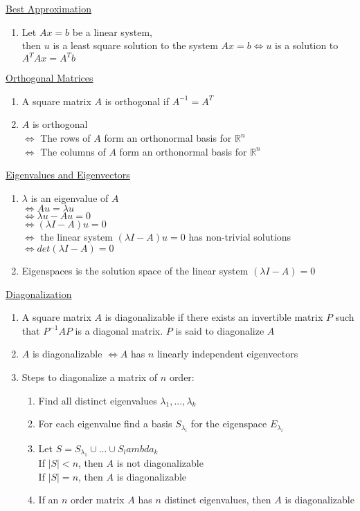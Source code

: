 \documentclass[a4paper,1pt,landscape]{article}
\begin{document}
\begin{multicols}{3}
\underline{Best Approximation}
\begin{enumerate}
    \item Let $Ax = b$ be a linear system, \\
    then $u$ is a least square solution to the system $Ax = b \Leftrightarrow u$ is a solution to $A^TAx = A^Tb$
\end{enumerate}

\underline{Orthogonal Matrices}
\begin{enumerate}
    \item A square matrix $A$ is orthogonal if $A^{-1} = A^T$
    \item $A$ is orthogonal \\
    $\Leftrightarrow$ The rows of $A$ form an orthonormal basis for $\mathbb{R}^n$ \\
    $\Leftrightarrow$ The columns of $A$ form an orthonormal basis for $\mathbb{R}^n$
    
\end{enumerate}

\underline{Eigenvalues and Eigenvectors}
\begin{enumerate}
    \item $\lambda$ is an eigenvalue of $A$ \\
    $\Leftrightarrow Au = \lambda u$ \\
    $\Leftrightarrow \lambda u - Au = 0$ \\
    $\Leftrightarrow (\lambda I - A)u = 0$ \\
    $\Leftrightarrow$ the linear system $(\lambda I - A)u = 0$ has non-trivial solutions
    $\Leftrightarrow det(\lambda I - A) = 0$
    \item Eigenspaces is the solution space of the linear system $(\lambda I - A) = 0$
\end{enumerate}

\underline{Diagonalization}
\begin{enumerate}
    \item A square matrix $A$ is diagonalizable if there exists an invertible matrix $P$ such that $P^{-1}AP$ is a diagonal matrix. $P$ is said to diagonalize $A$
    \item $A$ is diagonalizable $\Leftrightarrow A$ has $n$ linearly independent eigenvectors
    \item Steps to diagonalize a matrix of $n$ order: \begin{enumerate}
        \item Find all distinct eigenvalues $\lambda_1, ..., \lambda_k$
        \item For each eigenvalue find a basis $S_\lambda_i$ for the eigenspace $E_\lambda_i$
        \item Let $S = S_\lambda_1 \cup ... \cup S_lambda_k$ \\
        If $|S| < n$, then $A$ is not diagonalizable \\
        If $|S| = n$, then $A$ is diagonalizable
        \item If an $n$ order matrix $A$ has $n$ distinct eigenvalues, then $A$ is diagonalizable
    \end{enumerate}
\end{enumerate}


\end{multicols}
\end{document}
